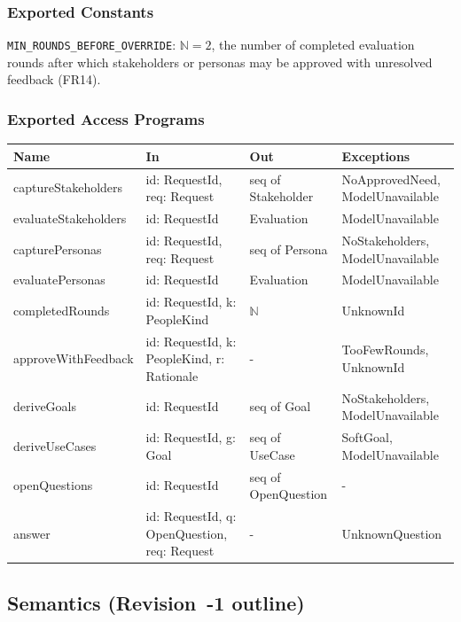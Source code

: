\documentclass[12pt, titlepage]{article}
\begin{document}
\subsubsection{Exported Constants}

\texttt{MIN\_ROUNDS\_BEFORE\_OVERRIDE}: $\mathbb{N} = 2$, the number of
completed evaluation rounds after which stakeholders or personas may be
approved with unresolved feedback (FR14).

\subsubsection{Exported Access Programs}

\begin{center}
\small
\begin{tabular}{>{\raggedright\arraybackslash}p{3.7cm} >{\raggedright\arraybackslash}p{3.8cm} >{\raggedright\arraybackslash}p{3.6cm} >{\raggedright\arraybackslash}p{3.7cm}}
\hline
\textbf{Name} & \textbf{In} & \textbf{Out} & \textbf{Exceptions} \\
\hline
captureStakeholders & id: RequestId, req: Request & seq of Stakeholder & NoApprovedNeed, ModelUnavailable \\
evaluateStakeholders & id: RequestId & Evaluation & ModelUnavailable \\
capturePersonas & id: RequestId, req: Request & seq of Persona & NoStakeholders, ModelUnavailable \\
evaluatePersonas & id: RequestId & Evaluation & ModelUnavailable \\
completedRounds & id: RequestId, k: PeopleKind & $\mathbb{N}$ & UnknownId \\
approveWithFeedback & id: RequestId, k: PeopleKind, r: Rationale & - & TooFewRounds, UnknownId \\
deriveGoals & id: RequestId & seq of Goal & NoStakeholders, ModelUnavailable \\
deriveUseCases & id: RequestId, g: Goal & seq of UseCase & SoftGoal, ModelUnavailable \\
openQuestions & id: RequestId & seq of OpenQuestion & - \\
answer & id: RequestId, q: OpenQuestion, req: Request & - & UnknownQuestion \\
\hline
\end{tabular}
\end{center}

\subsection{Semantics (Revision~-1 outline)}
\end{document}
